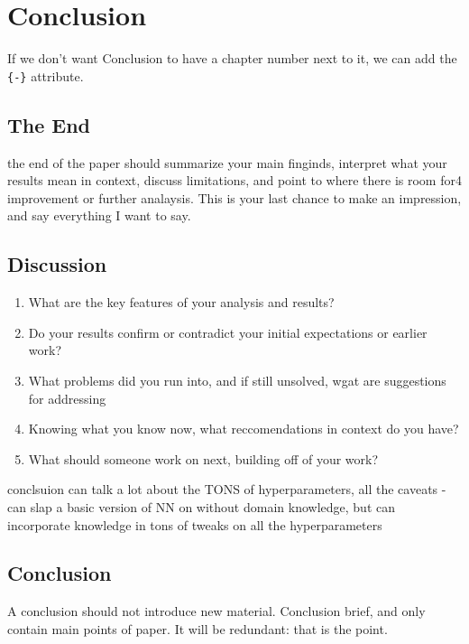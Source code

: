 \documentclass[12pt,twoside]{reedthesis}
\providecommand{\tightlist}{%
  \setlength{\itemsep}{0pt}\setlength{\parskip}{0pt}}
\begin{document}
\chapter*{Conclusion}\label{conclusion}

If we don't want Conclusion to have a chapter number next to it, we can
add the \texttt{\{-\}} attribute.

\section{The End}\label{the-end}

the end of the paper should summarize your main finginds, interpret what
your results mean in context, discuss limitations, and point to where
there is room for4 improvement or further analaysis. This is your last
chance to make an impression, and say everything I want to say.

\section{Discussion}\label{discussion}
\begin{enumerate}
\def\labelenumi{\arabic{enumi}.}
\tightlist
\item
  What are the key features of your analysis and results?
\item
  Do your results confirm or contradict your initial expectations or
  earlier work?
\item
  What problems did you run into, and if still unsolved, wgat are
  suggestions for addressing
\item
  Knowing what you know now, what reccomendations in context do you
  have?
\item
  What should someone work on next, building off of your work?
\end{enumerate}
conclsuion can talk a lot about the TONS of hyperparameters, all the
caveats - can slap a basic version of NN on without domain knowledge,
but can incorporate knowledge in tons of tweaks on all the
hyperparameters

\section{Conclusion}\label{conclusion-1}

A conclusion should not introduce new material. Conclusion brief, and
only contain main points of paper. It will be redundant: that is the
point.
\end{document}
